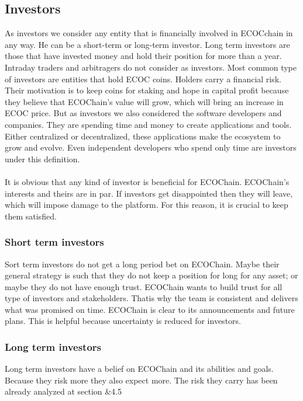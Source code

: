 \documentclass{article}
\begin{document}
\subsection{Investors}
As investors we consider any entity that is financially involved in ECOCchain in any way. He can be a short-term or long-term investor. Long term investors are those that have invested money and hold their position for more than a year. Intraday traders and arbitragers do not consider as investors.
Most common type of investors are entities that hold ECOC coins. Holders carry a financial risk. Their motivation is to keep coins for staking and hope in capital profit because they believe that ECOChain's value will grow, which will bring an increase in ECOC price. But as investors we also considered the software developers and companies. They are spending time and money to create applications and tools. Either centralized or decentralized, these applications make the ecosystem to grow and evolve. Even independent developers who spend only time are investors under this definition.
\paragraph{}
It is obvious that any kind of investor is beneficial for ECOChain. ECOChain's interests and theirs are in par. If investors get disappointed then they will leave, which will impose damage to the platform. For this reason, it is crucial to keep them satisfied.

\subsubsection{Short term investors}
Sort term investors do not get a long period bet on ECOChain. Maybe their general strategy is such that they do not keep a position for long for any asset; or maybe they do not have enough trust. ECOChain wants to build trust for all type of investors and stakeholders. Thatis why the team is consistent and delivers what was promised on time. ECOChain is clear to its announcements and future plans. This is helpful because uncertainty is reduced for investors.

\subsubsection{Long term investors}
Long term investors have a belief on ECOChain and its abilities and goals. Because they risk more they also expect more. The risk they carry has been already analyzed at section \&4.5 
\end{document}
